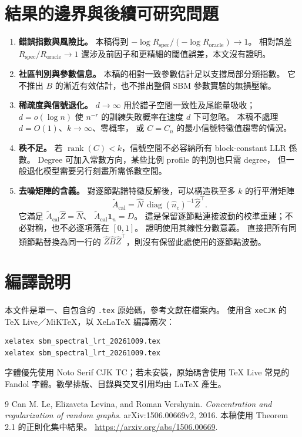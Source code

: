 \documentclass[11pt,a4paper]{article}
\theoremstyle{zhplain}
\numberwithin{equation}{section}
\newcommand{\one}{\mathbf 1}
\newcommand{\diag}{\operatorname{diag}}
\newcommand{\rank}{\operatorname{rank}}
\begin{document}
\section{結果的邊界與後續可研究問題}
\label{sec:scope}
\begin{enumerate}
 \item \textbf{錯誤指數與風險比。}
 本稿得到 \(-\log R_{\mathrm{spec}}/(-\log R_{\mathrm{oracle}})\to1\)。
 相對誤差 \(R_{\mathrm{spec}}/R_{\mathrm{oracle}}\to1\)
 還涉及前因子和更精細的閾值誤差，本文沒有證明。
 \item \textbf{社區判別與參數信息。}
 本稿的相對一致參數估計足以支撐局部分類指數。
 它不推出 \(B\) 的漸近有效估計，也不推出整個 SBM 參數實驗的無損壓縮。
 \item \textbf{稀疏度與信號退化。}
 \(d\to\infty\) 用於譜子空間一致性及尾能量吸收；
 \(d=o(\log n)\) 使 \(n^{-r}\) 的訓練失敗概率在速度 \(d\) 下可忽略。
 本稿不處理 \(d=O(1)\)、\(k\to\infty\)、零概率，
 或 \(C=C_n\) 的最小信號特徵值趨零的情況。
 \item \textbf{秩不足。}
 若 \(\rank(C)<k\)，信號空間不必容納所有 block-constant LLR 係數。
 Degree 可加入常數方向，某些比例 profile 的判別也只需 degree，
 但一般退化模型需要另行刻畫所需係數空間。
 \item \textbf{去噪矩陣的含義。}
 對逐節點譜特徵反解後，可以構造秩至多 \(k\) 的行平滑矩陣
 \[
 \widetilde A_{\mathrm{cal}}
   =\hat N\,\diag(\hat n_c)^{-1}\hat Z^\top.
 \]
 它滿足
 \(\widetilde A_{\mathrm{cal}}\hat Z=\hat N\)、
 \(\widetilde A_{\mathrm{cal}}\one_n=D\)。
 這是保留逐節點連接波動的校準重建；不必對稱，也不必逐項落在 \([0,1]\)。
 證明使用其線性分數意義。
 直接把所有同類節點替換為同一行的
 \(\hat Z\hat B\hat Z^\top\)，則沒有保留此處使用的逐節點波動。
\end{enumerate}

\section*{編譯說明}
本文件是單一、自包含的 \texttt{.tex} 原始碼，參考文獻在檔案內。
使用含 \texttt{xeCJK} 的 TeX Live／MiKTeX，以 XeLaTeX 編譯兩次：
\begin{verbatim}
xelatex sbm_spectral_lrt_20261009.tex
xelatex sbm_spectral_lrt_20261009.tex
\end{verbatim}
字體優先使用 Noto Serif CJK TC；若未安裝，原始碼會使用
TeX Live 常見的 Fandol 字體。數學排版、目錄與交叉引用均由 LaTeX 產生。

\begin{thebibliography}{9}
Can M. Le, Elizaveta Levina, and Roman Vershynin.
\newblock \emph{Concentration and regularization of random graphs}.
\newblock arXiv:1506.00669v2, 2016.
\newblock 本稿使用 Theorem 2.1 的正則化集中結果。
\newblock \url{https://arxiv.org/abs/1506.00669}.
\end{thebibliography}
\end{document}
